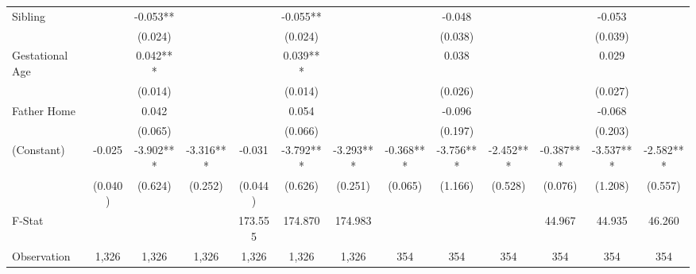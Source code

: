 \begin{tabular}{lcccccccccccc}
Sibling &  & -0.053** &  &  & -0.055** &  &  & -0.048 &  &  & -0.053 &  \\
 &  & (0.024) &  &  & (0.024) &  &  & (0.038) &  &  & (0.039) &  \\
Gestational Age &  & 0.042*** &  &  & 0.039*** &  &  & 0.038 &  &  & 0.029 &  \\
 &  & (0.014) &  &  & (0.014) &  &  & (0.026) &  &  & (0.027) &  \\
Father Home &  & 0.042 &  &  & 0.054 &  &  & -0.096 &  &  & -0.068 &  \\
 &  & (0.065) &  &  & (0.066) &  &  & (0.197) &  &  & (0.203) &  \\
(Constant) & -0.025 & -3.902*** & -3.316*** & -0.031 & -3.792*** & -3.293*** & -0.368*** & -3.756*** & -2.452*** & -0.387*** & -3.537*** & -2.582*** \\
 & (0.040) & (0.624) & (0.252) & (0.044) & (0.626) & (0.251) & (0.065) & (1.166) & (0.528) & (0.076) & (1.208) & (0.557) \\
\midrule 
F-Stat &  &  &  & 173.555 & 174.870 & 174.983 &  &  &  & 44.967 & 44.935 & 46.260 \\
Observation & 1,326 & 1,326 & 1,326 & 1,326 & 1,326 & 1,326 & 354 & 354 & 354 & 354 & 354 & 354 \\
\midrule 
\bottomrule 
\end{tabular}
